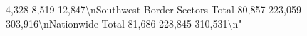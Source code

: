 \documentclass[
]{krantz}
\makeatletter
\newenvironment{Shaded}{\begin{snugshade}}{\end{snugshade}}
\newenvironment{kframe}{%
\medskip{}
\setlength{\fboxsep}{.8em}
 \def\at@end@of@kframe{}%
 \ifinner\ifhmode%
  \def\at@end@of@kframe{\end{minipage}}%
  \begin{minipage}{\columnwidth}%
 \fi\fi%
 \def\FrameCommand##1{\hskip\@totalleftmargin \hskip-\fboxsep
 \colorbox{shadecolor}{##1}\hskip-\fboxsep
     \hskip-\linewidth \hskip-\@totalleftmargin \hskip\columnwidth}%
 \MakeFramed {\advance\hsize-\width
   \@totalleftmargin\z@ \linewidth\hsize
   \@setminipage}}%
 {\par\unskip\endMakeFramed%
 \at@end@of@kframe}
\renewenvironment{Shaded}{\begin{kframe}}{\end{kframe}}
\makeatother
\begin{document}
\begin{Shaded}
\begin{Highlighting}[]
                                 4,328                     8,519                     12,847\textbackslash{}nSouthwest Border Sectors Total                  80,857                   223,059                   303,916\textbackslash{}nNationwide Total                                81,686                   228,845                   310,531\textbackslash{}n"                                                                                                                                                                                                                                                                                                                                                                                                                                                                                                                                                                                                                                                                                                                                                                                                                                                                                                                                                                                                                                                                                                                                                                                                                                                                                                                                                                                                                                                                                                                                                                                                                                                                                                                                                                                                                                                                                                                                                                                                                                                                                                                                                                                                                                                                                                                                                                                                                                                                                                                                                                                                                                                                                                                                                                                                                                                                                                                                                                                                                                                               
\end{Highlighting}
\end{Shaded}
\end{document}

